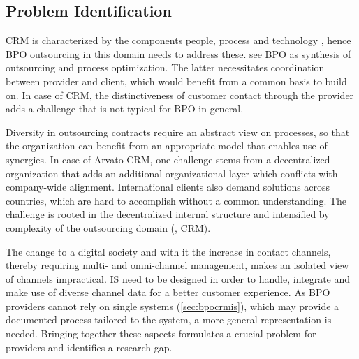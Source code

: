 \subsection{Problem Identification}
\label{sec:proide}
CRM is characterized by the components people, process and technology \citep{Chen_2003}, hence BPO outsourcing in this domain needs to address these. \cite{schewe2007} see BPO as synthesis of outsourcing and process optimization. The latter necessitates coordination between provider and client, which would benefit from a common basis to build on. In case of CRM, the distinctiveness of customer contact through the provider adds a challenge that is not typical for BPO in general. 

Diversity in outsourcing contracts require an abstract view on processes, so that the organization can benefit from an appropriate model that enables use of synergies. In case of Arvato CRM, one challenge stems from a decentralized organization that adds an additional organizational layer which conflicts with company-wide alignment. International clients also demand solutions across countries, which are hard to accomplish without a common understanding. The challenge is rooted in the decentralized internal structure and intensified by complexity of the outsourcing domain (\eg, \acrshort{CRM}).

The change to a digital society and with it the increase in contact channels, thereby requiring multi- and omni-channel management, makes an isolated view of channels impractical. \acrshort{IS} need to be designed in order to handle, integrate and make use of diverse channel data for a better customer experience. As BPO providers cannot rely on single systems (\cf \ref{sec:bpocrmis}), which may provide a documented process tailored to the system, a more general representation is needed. Bringing together these aspects formulates a crucial problem for providers and identifies a research gap. 


